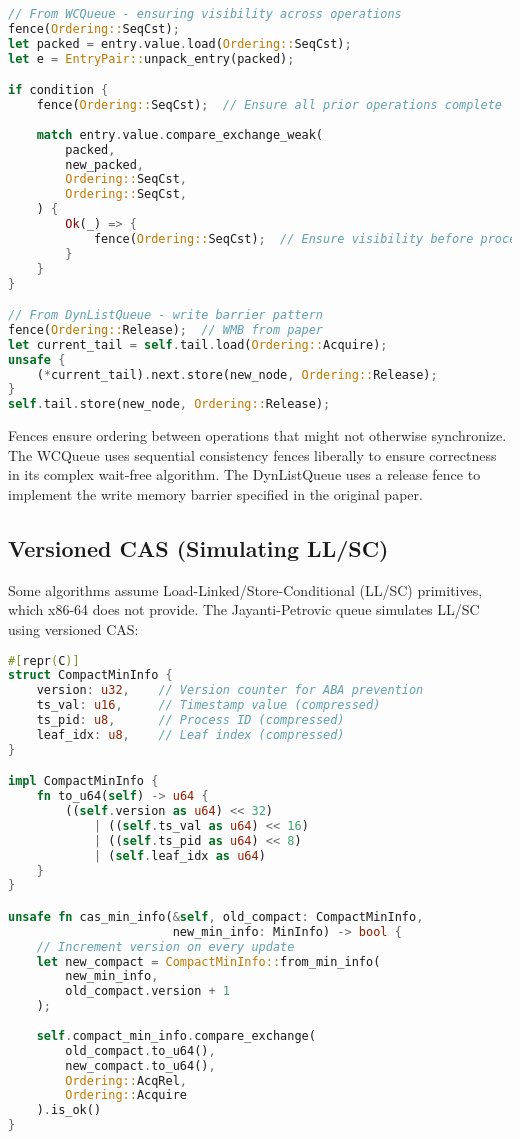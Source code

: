 \begin{lstlisting}[language=Rust, style=boxed, caption={Explicit memory fence usage}, label={lst:memory-fences}]
// From WCQueue - ensuring visibility across operations
fence(Ordering::SeqCst);
let packed = entry.value.load(Ordering::SeqCst);
let e = EntryPair::unpack_entry(packed);

if condition {
    fence(Ordering::SeqCst);  // Ensure all prior operations complete
    
    match entry.value.compare_exchange_weak(
        packed,
        new_packed,
        Ordering::SeqCst,
        Ordering::SeqCst,
    ) {
        Ok(_) => {
            fence(Ordering::SeqCst);  // Ensure visibility before proceeding
        }
    }
}

// From DynListQueue - write barrier pattern
fence(Ordering::Release);  // WMB from paper
let current_tail = self.tail.load(Ordering::Acquire);
unsafe {
    (*current_tail).next.store(new_node, Ordering::Release);
}
self.tail.store(new_node, Ordering::Release);
\end{lstlisting}

Fences ensure ordering between operations that might not otherwise synchronize. The WCQueue uses sequential consistency fences liberally to ensure correctness in its complex wait-free algorithm. The DynListQueue uses a release fence to implement the write memory barrier specified in the original paper.

\subsection{Versioned CAS (Simulating LL/SC)}

Some algorithms assume Load-Linked/Store-Conditional (LL/SC) primitives, which x86-64 does not provide. The Jayanti-Petrovic queue simulates LL/SC using versioned CAS:

\begin{lstlisting}[language=Rust, style=boxed, caption={Versioned CAS for LL/SC simulation}, label={lst:versioned-cas}]
#[repr(C)]
struct CompactMinInfo {
    version: u32,    // Version counter for ABA prevention
    ts_val: u16,     // Timestamp value (compressed)
    ts_pid: u8,      // Process ID (compressed)  
    leaf_idx: u8,    // Leaf index (compressed)
}

impl CompactMinInfo {
    fn to_u64(self) -> u64 {
        ((self.version as u64) << 32)
            | ((self.ts_val as u64) << 16)
            | ((self.ts_pid as u64) << 8)
            | (self.leaf_idx as u64)
    }
}

unsafe fn cas_min_info(&self, old_compact: CompactMinInfo, 
                       new_min_info: MinInfo) -> bool {
    // Increment version on every update
    let new_compact = CompactMinInfo::from_min_info(
        new_min_info, 
        old_compact.version + 1
    );
    
    self.compact_min_info.compare_exchange(
        old_compact.to_u64(),
        new_compact.to_u64(),
        Ordering::AcqRel,
        Ordering::Acquire
    ).is_ok()
}
\end{lstlisting}

